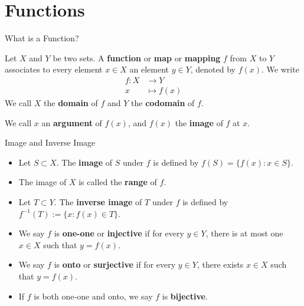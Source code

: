 \documentclass[9pt,aspectratio=169]{beamer}
\begin{document}
\section{Functions}

\begin{frame}{What is a Function?}
    \begin{definition}
        Let $X$ and $Y$ be two sets. A \textbf{function} or \textbf{map} or
        \textbf{mapping} $f$ from $X$ to $Y$ associates to every element $x
        \in X$ an element $y \in Y$, denoted by $f(x)$. We write
        \begin{align*}
            f\colon X &\to Y\\
            x &\mapsto f(x)
        \end{align*}
        We call $X$ the \textbf{domain} of $f$ and $Y$ the \textbf{codomain} of
        $f$.

        We call $x$ an \textbf{argument} of $f(x)$, and $f(x)$ the \textbf{image}
        of $f$ at $x$.        
    \end{definition}
\end{frame}

\begin{frame}{Image and Inverse Image}
    \begin{definition}
        \begin{itemize}
            \item Let $S \subset X$. The \textbf{image} of $S$ under $f$ is
            defined by $f(S) = \{f(x): x\in S\}$.
            \item The image of $X$ is called the \textbf{range} of $f$.
            \item Let $T \subset Y$. The \textbf{inverse image} of $T$ under
            $f$ is defined by $f^{-1}(T) := \{x: f(x) \in T\}$.
            \item We say $f$ is \textbf{one-one} or \textbf{injective} if for
            every $y \in Y$, there is at most one $x \in X$ such that $y =
            f(x)$.
            \item We say $f$ is \textbf{onto} or \textbf{surjective} if for
            every $y \in Y$, there exists $x \in X$ such that $y = f(x)$.
            \item If $f$ is both one-one and onto, we say $f$ is
            \textbf{bijective}.
        \end{itemize}        
    \end{definition}
\end{frame}
\end{document}
